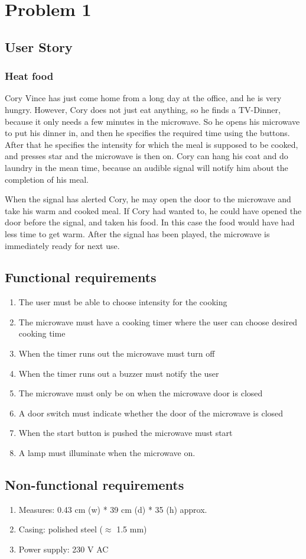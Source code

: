 \chapter{Problem 1}
\label{chp:intro}
\section{User Story}
\subsection{Heat food}
Cory Vince has just come home from a long day at the office, and he is very hungry. However, Cory does not just eat anything, so he finds a TV-Dinner, because it only needs a few minutes in the microwave. So he opens his microwave to put his dinner in, and then he specifies the required time using the buttons. After that he specifies the intensity for which the meal is supposed to be cooked, and presses star and the microwave is then on. Cory can hang his coat and do laundry in the mean time, because an audible signal will notify him about the completion of his meal.

When the signal has alerted Cory, he may open the door to the microwave and take his warm and cooked meal. If Cory had wanted to, he could have opened the door before the signal, and taken his food. In this case the food would have had less time to get warm. After the signal has been played, the microwave is immediately ready for next use.

\section{Functional requirements}
\begin{enumerate}[label=FR-\arabic*:]

\item The user must be able to choose intensity for the cooking
\item The microwave must have a cooking timer where the user can choose desired cooking time
\item When the timer runs out the microwave must turn off
\item When the timer runs out a buzzer must notify the user
\item The microwave must only be on when the microwave door is closed
\item A door switch must indicate whether the door of the microwave is closed
\item When the start button is pushed the microwave must start
\item A lamp must illuminate when the microwave on.

\end{enumerate}

\section{Non-functional requirements}

\begin{enumerate}[label=NFR-\arabic*:]
 \item Measures: 0.43 cm (w) * 39 cm (d) * 35 (h) approx.
 \item Casing: polished steel ($\approx$ 1.5 mm)
 \item Power supply: 230 V AC
\end{enumerate}
